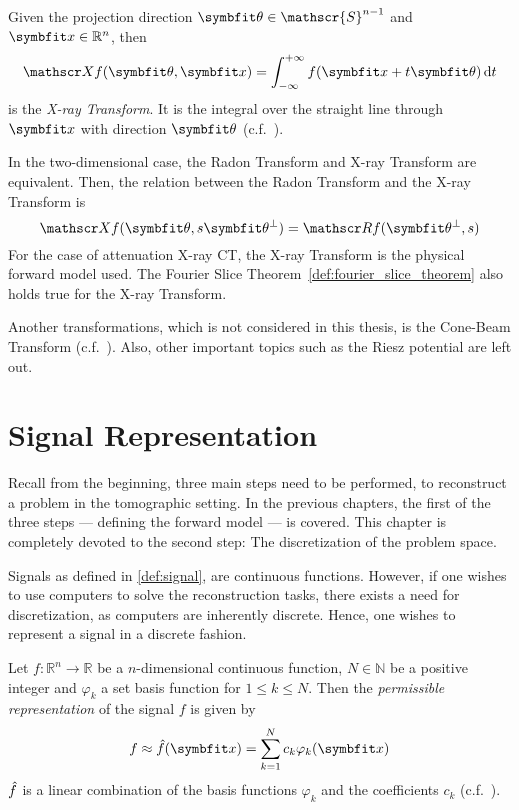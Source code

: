 \begin{definition}\label{def:x-ray_transform}
	Given the projection direction \(\mvec{\theta} \in \mathscr{S}^{n-1}\) and \(\mvec{x} \in
	\mathbb{R}^n\), then
	\[ \xray f(\mvec{\theta}, \mvec{x}) = \int_{-\infty}^{+\infty} f(\mvec{x} + t \mvec{\theta}) \, \mathrm{d} t \]
	is the \textit{X-ray Transform}. It is the integral over the straight line through
	\(\mvec{x}\) with direction \(\mvec{\theta}\)
	(c.f.~\cite{natterer_mathematics_1986,solmon_x-ray_1976}).
\end{definition}

In the two-dimensional case, the Radon Transform and X-ray Transform are equivalent.
Then, the relation between the Radon Transform and the X-ray Transform is
\begin{equation}
	\xray f(\mvec{\theta}, s\mvec{\theta}^\perp) = \radon f(\mvec{\theta}^\perp, s)
\end{equation}
For the case of attenuation X-ray CT, the X-ray Transform is the physical forward model used. The
Fourier Slice Theorem~\ref{def:fourier_slice_theorem} also holds true for the X-ray Transform.

Another transformations, which is not considered in this thesis, is the Cone-Beam Transform
(c.f.~\cite[Chapter~2]{carpio_inverse_2008}). Also, other important topics such as the Riesz
potential are left out.

\chapter{Signal Representation}\label{chap:signal_representation}

Recall from the beginning, three main steps need to be performed, to reconstruct a problem in the
tomographic setting. In the previous chapters, the first of the three steps --- defining the forward
model --- is covered. This chapter is completely devoted to the second step: The discretization of
the problem space.

Signals as defined in \autoref{def:signal}, are continuous functions. However, if one wishes to use
computers to solve the reconstruction tasks, there exists a need for discretization, as computers
are inherently discrete. Hence, one wishes to represent a signal in a discrete fashion.

\begin{definition}\label{def:permissible_representation}
	Let \(f\colon \mathbb{R}^n \to \mathbb{R}\) be a \(n\)-dimensional continuous function,
	\(N \in \mathbb{N}\) be a positive integer and \(\varphi_k\) a set basis function for
	\(1 \leq k \leq N\). Then the \textit{permissible representation} of the signal \(f\) is
	given by
	\[ f \approx \near{f}(\mvec{x}) = \sum_{k=1}^{N} c_k \varphi_k(\mvec{x}) \]
	\(\hat{f}\) is a linear combination of the basis functions \(\varphi_k\) and the
	coefficients \(c_k\) (c.f.\ \cite{herman_basis_2015}).
\end{definition}


